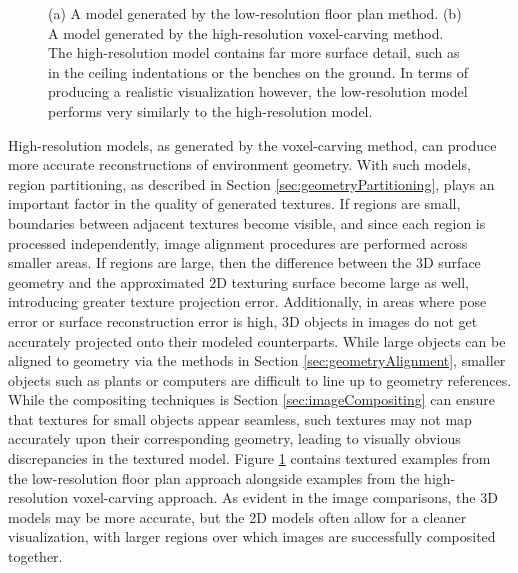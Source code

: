 \documentclass[]{spie}  %
\begin{document}
\begin{figure}
{  } 
  \caption{(a) A model generated by the low-resolution floor plan
    method. (b) A model generated by the high-resolution voxel-carving
    method. The high-resolution model contains far more surface
    detail, such as in the ceiling indentations or the benches on the
    ground. In terms of producing a realistic visualization however,
    the low-resolution model performs very similarly to the
    high-resolution model.}
  \label{fig:2dvs3d}
\end{figure}

High-resolution models, as generated by the voxel-carving method, can
produce more accurate reconstructions of environment geometry. With
such models, region partitioning, as described in Section
\ref{sec:geometryPartitioning}, plays an important factor in the
quality of generated textures. If regions are small, boundaries
between adjacent textures become visible, and since each region is
processed independently, image alignment procedures are performed
across smaller areas. If regions are large, then the difference
between the 3D surface geometry and the approximated 2D texturing
surface become large as well, introducing greater texture projection
error. Additionally, in areas where pose error or surface
reconstruction error is high, 3D objects in images do not get
accurately projected onto their modeled counterparts. While large
objects can be aligned to geometry via the methods in Section
\ref{sec:geometryAlignment}, smaller objects such as plants or
computers are difficult to line up to geometry references. While the
compositing techniques is Section \ref{sec:imageCompositing} can
ensure that textures for small objects appear seamless, such textures
may not map accurately upon their corresponding geometry, leading to
visually obvious discrepancies in the textured model. Figure
\ref{fig:2dvs3d} contains textured examples from the low-resolution
floor plan approach alongside examples from the high-resolution
voxel-carving approach. As evident in the image comparisons, the 3D
models may be more accurate, but the 2D models often allow for a
cleaner visualization, with larger regions over which images are
successfully composited together.
\end{document}
